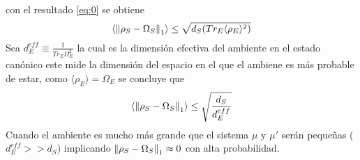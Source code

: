 con el resultado \ref{eq:0} se obtiene
\begin{equation}
\langle \norm{\rho_{S} -\Omega_{S}}_{1} \rangle \le \sqrt{d_{S}(Tr_{E} \langle \rho_{E} \rangle^{2})}
\end{equation}
Sea $d_{E}^{eff} \equiv \frac{1}{Tr_{E} \Omega_{E}^{2}}$ la cual es la dimensión efectiva del ambiente en el estado canónico este mide la dimensión del espacio en el que el ambiene es más probable de estar, como $\langle \rho_{E} \rangle = \Omega_{E}$ se concluye que 
\begin{equation}
\langle \norm{\rho_{S} -\Omega_{S}}_{1} \rangle \le \sqrt{\frac{d_{S}}{d_{E}^{eff}}}
\end{equation}
Cuando  el ambiente es mucho más grande que el sistema $\mu$ y $\mu'$ serán pequeñas ($d_{E}^{eff}>>d_{S}$) implicando $\norm{\rho_{S} -\Omega_{S}}_{1} \approx 0$ con alta probabilidad.












